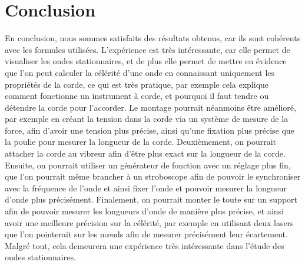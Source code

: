 \documentclass[11pt]{article}
\begin{document}
    \section{Conclusion}\label{sec:conclusion}

    En conclusion, nous sommes satisfaits des résultats obtenus, car ils sont cohérents avec les formules utilisées.
    L'expérience est très intéressante, car elle permet de visualiser les ondes stationnaires, et de plus elle permet
    de mettre en évidence que l'on peut calculer la célérité d'une onde en connaissant uniquement les propriétés
    de la corde, ce qui est très pratique, par exemple cela explique comment fonctionne un instrument à corde, et
    pourquoi il faut tendre ou détendre la corde pour l'accorder.
    Le montage pourrait néanmoins être amélioré, par exemple en créant la tension dans la corde via un système de
    mesure de la force, afin d'avoir une tension plus précise, ainsi qu'une fixation plus précise que la poulie pour
    mesurer la longueur de la corde.
    Deuxièmement, on pourrait attacher la corde au vibreur afin d'être plus exact sur la longueur de la corde.
    Ensuite, on pourrait utiliser un générateur de fonction avec un réglage plus fin, que l'on pourrait même
    brancher à un stroboscope afin de pouvoir le synchroniser avec la fréquence de l'onde et ainsi fixer l'onde
    et pouvoir mesurer la longueur d'onde plus précisément.
    Finalement, on pourrait monter le toute sur un support afin de pouvoir mesurer les longueurs d'onde de manière
    plus précise, et ainsi avoir une meilleure précision sur la célérité, par exemple en utilisant deux lasers que
    l'on pointerait sur les nœuds afin de mesurer précisément leur écartement.
    Malgré tout, cela demeurera une expérience très intéressante dans l'étude des ondes stationnaires.
\end{document}

